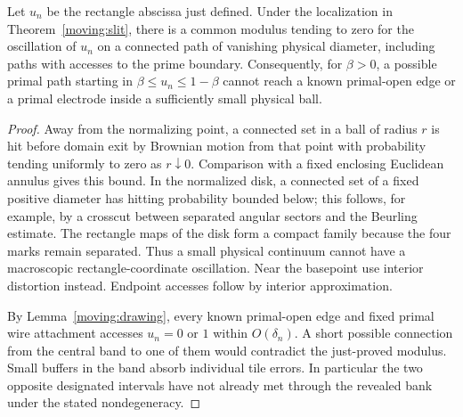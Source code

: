 \begin{lemma}\label{moving:chart-modulus}
Let $u_n$ be the rectangle abscissa just defined.
Under the localization in Theorem~\ref{moving:slit}, there is a common
modulus tending to zero for the oscillation of $u_n$ on a connected
path of vanishing physical diameter, including paths with accesses
to the prime boundary.  Consequently, for $\beta>0$, a possible
primal path starting in $\beta\le u_n\le1-\beta$ cannot reach a known
primal-open edge or a primal electrode inside a sufficiently small
physical ball.
\end{lemma}
\begin{proof}
Away from the normalizing point, a connected set in a ball of radius
$r$ is hit before domain exit by Brownian motion from that point
with probability tending uniformly to zero as $r\downarrow0$.
Comparison with a fixed enclosing Euclidean annulus gives this
bound.  In the normalized disk, a connected set of a fixed positive
diameter has hitting probability bounded below; this follows, for
example, by a crosscut between separated angular sectors and the
Beurling estimate.  The rectangle maps of the disk form a compact
family because the four marks remain separated.  Thus a small
physical continuum cannot have a macroscopic rectangle-coordinate
oscillation.  Near the basepoint use interior distortion instead.
Endpoint accesses follow by interior approximation.

By Lemma~\ref{moving:drawing}, every known primal-open edge and fixed
primal wire attachment accesses $u_n=0$ or $1$ within
$O(\delta_n)$.  A short possible connection from the central band to
one of them would contradict the just-proved modulus.  Small buffers
in the band absorb individual tile errors.  In particular the two
opposite designated intervals have not already met through the
revealed bank under the stated nondegeneracy.
\end{proof}


